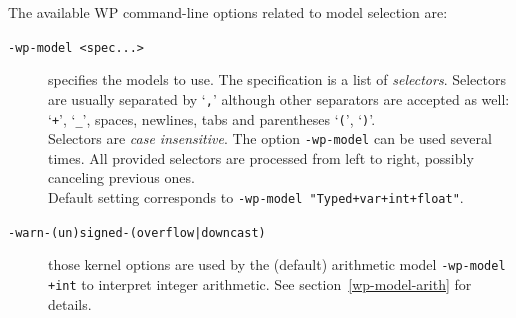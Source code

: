 \clearpage

The available \textsf{WP} command-line options related to model selection are:
\begin{description}
\item[\tt -wp-model <spec...>] specifies the models to use. The
  specification is a list of \emph{selectors}. Selectors are usually
  separated by `\verb|,|' although other separators are accepted as well:
  `\verb|+|', `\verb|_|', spaces, newlines, tabs and parentheses `\verb|(|',
  `\verb|)|'.\\ Selectors are \emph{case insensitive}. The option
  \texttt{-wp-model} can be used several times. All provided selectors
  are processed from left to right, possibly canceling previous ones.\\
  Default setting corresponds to \texttt{-wp-model "Typed+var+int+float"}.

\item[\tt -warn-(un)signed-(overflow|downcast)] those kernel options are
  used by the (default) arithmetic model \texttt{-wp-model +int} to interpret integer
  arithmetic. See section~\ref{wp-model-arith} for details.


\end{description}
